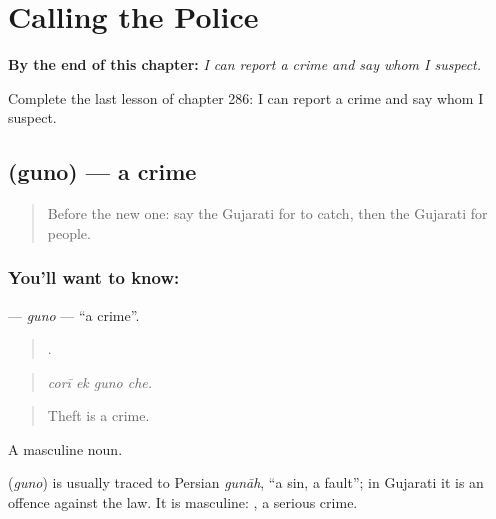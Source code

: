 
\chapter{Calling the Police}
\label{ch:gu-calling-the-police}

\begin{chapteropening}
\textbf{By the end of this chapter:} \emph{I can report a crime and say whom I suspect.}

Complete the last lesson of chapter 286: I can report a crime and say whom I suspect.
\end{chapteropening}

\section[\texorpdfstring{\gu{ગુનો} (guno)}{ગુનો (guno)}]{ (guno) — a crime}

\label{lesson:GU-C286-guno}



\begin{quote}
Before the new one: say the Gujarati for to catch, then the Gujarati for people.
\end{quote}

\subsection*{You'll want to know: }
\textbf{} — \emph{guno} — \textquotedblleft{}a crime\textquotedblright{}.

\begin{quote}
   .
\end{quote}

\begin{quote}
\emph{corī ek guno che.}
\end{quote}

\begin{quote}
Theft is a crime.
\end{quote}

A masculine noun.

\begin{cousinweb}
\textbf{} (\emph{guno}) is usually traced to Persian \emph{gunāh}, \textquotedblleft{}a sin, a fault\textquotedblright{}; in Gujarati it is an offence against the law. It is masculine: \textbf{ }, a serious crime.
\end{cousinweb}

